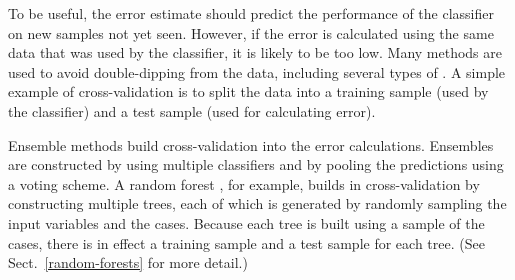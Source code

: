 
To be useful, the error estimate should predict the performance of the
classifier on new samples not yet seen.  However, if the error is
calculated using the same data that was used by the classifier, it is
likely to be too low.  Many methods are used to avoid
double-dipping from the data, including several types of
.  A simple example of cross-validation is to
split the data into a training sample (used by the classifier) and a
test sample (used for calculating error).


Ensemble methods build cross-validation into the error
calculations. Ensembles are constructed by using multiple classifiers
and by pooling the predictions using a voting scheme.  A random forest
\cite{Br01,Cu04}, for example, builds in cross-validation by
constructing multiple trees, each of which is generated by randomly
sampling the input variables and the cases.  Because each tree is
built using a sample of the cases, there is in effect a training
sample and a test sample for each tree.  (See
Sect.~\ref{random-forests} for more detail.)





